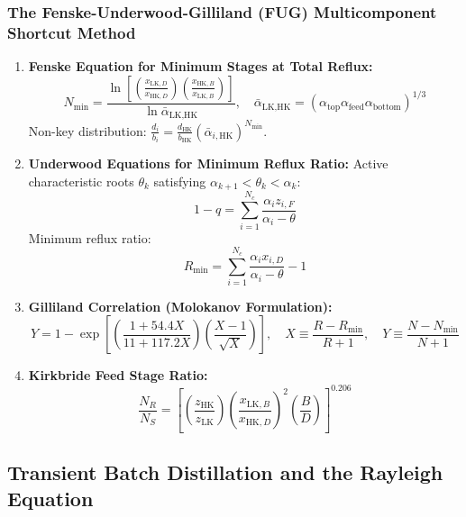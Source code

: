 \documentclass[11pt,a4paper]{article}
\begin{document}
\subsubsection{The Fenske-Underwood-Gilliland (FUG) Multicomponent Shortcut Method}
\begin{enumerate}[leftmargin=*]
    \item \textbf{Fenske Equation for Minimum Stages at Total Reflux:}
    \begin{equation}
    N_{\min} = \frac{\ln\left[ \left( \frac{x_{\text{LK},D}}{x_{\text{HK},D}} \right) \left( \frac{x_{\text{HK},B}}{x_{\text{LK},B}} \right) \right]}{\ln \bar{\alpha}_{\text{LK,HK}}}, \quad \bar{\alpha}_{\text{LK,HK}} = (\alpha_{\text{top}} \alpha_{\text{feed}} \alpha_{\text{bottom}})^{1/3}
    \end{equation}
    Non-key distribution: $\frac{d_i}{b_i} = \frac{d_{\text{HK}}}{b_{\text{HK}}} (\bar{\alpha}_{i,\text{HK}})^{N_{\min}}$.
    \item \textbf{Underwood Equations for Minimum Reflux Ratio:}
    Active characteristic roots $\theta_k$ satisfying $\alpha_{k+1} < \theta_k < \alpha_k$:
    \begin{equation}
    1 - q = \sum_{i=1}^{N_c} \frac{\alpha_i z_{i,F}}{\alpha_i - \theta}
    \end{equation}
    Minimum reflux ratio:
    \begin{equation}
    R_{\min} = \sum_{i=1}^{N_c} \frac{\alpha_i x_{i,D}}{\alpha_i - \theta} - 1
    \end{equation}
    \item \textbf{Gilliland Correlation (Molokanov Formulation):}
    \begin{equation}
    Y = 1 - \exp\left[ \left( \frac{1 + 54.4 X}{11 + 117.2 X} \right) \left( \frac{X - 1}{\sqrt{X}} \right) \right], \quad X \equiv \frac{R - R_{\min}}{R + 1}, \quad Y \equiv \frac{N - N_{\min}}{N + 1}
    \end{equation}
    \item \textbf{Kirkbride Feed Stage Ratio:}
    \begin{equation}
    \frac{N_R}{N_S} = \left[ \left( \frac{z_{\text{HK}}}{z_{\text{LK}}} \right) \left( \frac{x_{\text{LK},B}}{x_{\text{HK},D}} \right)^2 \left( \frac{B}{D} \right) \right]^{0.206}
    \end{equation}
\end{enumerate}

\subsection{Transient Batch Distillation and the Rayleigh Equation}
\end{document}
